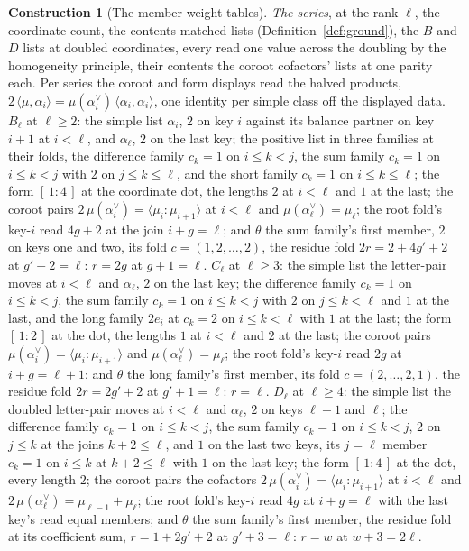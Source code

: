 \documentclass[11pt]{article}
\theoremstyle{definition}
\newtheorem{construction}{Construction}
\begin{document}
\begin{construction}[The member weight tables]
\emph{The series}, at the rank $\ell$, the coordinate count, the
contents matched lists (Definition~\ref{def:ground}), the $B$ and
$D$ lists at doubled coordinates, every read one value across the
doubling by the homogeneity principle, their contents the coroot
cofactors' lists at one parity each. Per series the coroot and
form displays read the halved products,
$2\,\langle\mu,\alpha_i\rangle
=\mu(\alpha_i^\vee)\,\langle\alpha_i,\alpha_i\rangle$, one
identity per simple class off the displayed data. $B_\ell$ at $\ell\ge2$: the simple
list $\alpha_i$, $2$ on key $i$ against its balance partner on
key $i{+}1$ at $i<\ell$, and $\alpha_\ell$, $2$ on the last key;
the positive list in three families at their folds, the
difference family $c_k=1$ on $i\le k<j$, the sum family $c_k=1$
on $i\le k<j$ with $2$ on $j\le k\le\ell$, and the short family
$c_k=1$ on $i\le k\le\ell$; the form $[\,1:4\,]$ at the
coordinate dot, the lengths $2$ at $i<\ell$ and $1$ at the last;
the coroot pairs $2\,\mu(\alpha_i^\vee)=
\langle\mu_i\!:\!\mu_{i+1}\rangle$ at $i<\ell$ and
$\mu(\alpha_\ell^\vee)=\mu_\ell$; the root fold's key-$i$ read
$4g+2$ at the join $i+g=\ell$; and $\theta$ the sum family's
first member, $2$ on keys one and two, its fold
$c=(1,2,\dots,2)$, the residue fold $2r=2+4g'+2$ at $g'+2=\ell$:
$r=2g$ at $g+1=\ell$. $C_\ell$ at $\ell\ge3$: the simple list the
letter-pair moves at $i<\ell$ and $\alpha_\ell$, $2$ on the last
key; the difference family $c_k=1$ on $i\le k<j$, the sum family
$c_k=1$ on $i\le k<j$ with $2$ on $j\le k<\ell$ and $1$ at the
last, and the long family $2e_i$ at $c_k=2$ on
$i\le k<\ell$ with $1$ at the last; the form $[\,1:2\,]$ at the
dot, the lengths $1$ at $i<\ell$ and $2$ at the last; the coroot
pairs $\mu(\alpha_i^\vee)=\langle\mu_i\!:\!\mu_{i+1}\rangle$ and
$\mu(\alpha_\ell^\vee)=\mu_\ell$; the root fold's key-$i$ read
$2g$ at $i+g=\ell+1$; and $\theta$ the long family's first
member, its fold $c=(2,\dots,2,1)$, the residue fold
$2r=2g'+2$ at $g'+1=\ell$: $r=\ell$. $D_\ell$ at $\ell\ge4$: the
simple list the doubled letter-pair moves at $i<\ell$ and
$\alpha_\ell$, $2$ on keys $\ell{-}1$ and $\ell$; the difference
family $c_k=1$ on $i\le k<j$, the sum family $c_k=1$ on $i\le k<j$, $2$ on
$j\le k$ at the joins $k+2\le\ell$, and $1$ on the last two keys,
its $j=\ell$ member $c_k=1$ on $i\le k$ at $k+2\le\ell$ with $1$
on the last key; the form $[\,1:4\,]$ at the dot, every length
$2$; the coroot pairs the cofactors
$2\,\mu(\alpha_i^\vee)=\langle\mu_i\!:\!\mu_{i+1}\rangle$ at
$i<\ell$ and $2\,\mu(\alpha_\ell^\vee)=\mu_{\ell-1}+\mu_\ell$;
the root fold's key-$i$ read $4g$ at $i+g=\ell$ with the last
key's read equal members; and $\theta$ the sum family's first
member, the residue fold at its coefficient sum,
$r=1+2g'+2$ at $g'+3=\ell$: $r=w$ at $w+3=2\ell$.


\end{construction}
\end{document}

